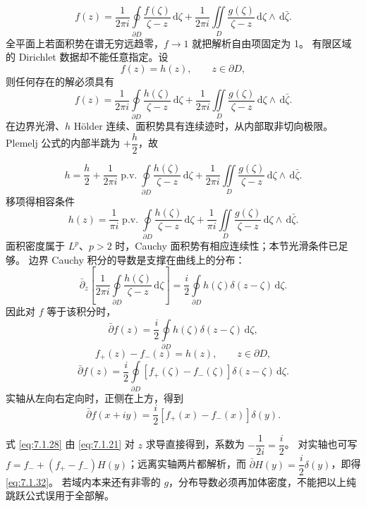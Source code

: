 \documentclass[lang=cn,scheme=chinese,mode=simple,device=normal,color=blue,math=cm,thmcnt=section,12pt]{elegantbook}
\newcommand{\dd}{\,\mathrm{d}}
\newcommand{\eqq}[2]{\tag{#1}\label{eq:#1}#2}
\begin{document}
\begin{equation}
\eqq{7.1.24}{f(z)=\dfrac{1}{2\pi i}\oint\limits_{\partial D}\dfrac{f(\zeta)}{\zeta-z}\dd\zeta
+\dfrac{1}{2\pi i}\iint\limits_D\dfrac{g(\zeta)}{\zeta-z}\dd\zeta\wedge\dd\bar\zeta.}
\end{equation}
全平面上若面积势在谱无穷远趋零，$f\to1$ 就把解析自由项固定为 1。
有限区域的 Dirichlet 数据却不能任意指定。设
\begin{equation}
\eqq{7.1.25}{f(z)=h(z),\qquad z\in\partial D,}
\end{equation}
则任何存在的解必须具有
\begin{equation}
\eqq{7.1.26}{f(z)=\dfrac{1}{2\pi i}\oint\limits_{\partial D}\dfrac{h(\zeta)}{\zeta-z}\dd\zeta
+\dfrac{1}{2\pi i}\iint\limits_D\dfrac{g(\zeta)}{\zeta-z}\dd\zeta\wedge\dd\bar\zeta.}
\end{equation}
在边界光滑、$h$ Hölder 连续、面积势具有连续迹时，从内部取非切向极限。Plemelj 公式的内部半跳为 $+\dfrac{h}{2}$，故

\[
h=\dfrac{h}{2}+\dfrac{1}{2\pi i}\operatorname{p.v.}\oint\limits_{\partial D}\dfrac{h(\zeta)}{\zeta-z}\dd\zeta
+\dfrac{1}{2\pi i}\iint\limits_D\dfrac{g(\zeta)}{\zeta-z}\dd\zeta\wedge\dd\bar\zeta.
\]
移项得相容条件
\begin{equation}
\eqq{7.1.27}{h(z)=\dfrac{1}{\pi i}\operatorname{p.v.}\oint\limits_{\partial D}\dfrac{h(\zeta)}{\zeta-z}\dd\zeta
+\dfrac{1}{\pi i}\iint\limits_D\dfrac{g(\zeta)}{\zeta-z}\dd\zeta\wedge\dd\bar\zeta.}
\end{equation}
面积密度属于 $L^p$、$p>2$ 时，Cauchy 面积势有相应连续性；本节光滑条件已足够。
边界 Cauchy 积分的导数是支撑在曲线上的分布：
\begin{equation}
\eqq{7.1.28}{\bar\partial_z\left[\dfrac{1}{2\pi i}\oint\limits_{\partial D}\dfrac{h(\zeta)}{\zeta-z}\dd\zeta\right]
=\dfrac{i}{2}\oint\limits_{\partial D}h(\zeta)\delta(z-\zeta)\dd\zeta.}
\end{equation}
因此对 $f$ 等于该积分时，
\begin{equation}
\eqq{7.1.29}{\bar\partial f(z)=\dfrac{i}{2}\oint\limits_{\partial D}h(\zeta)\delta(z-\zeta)\dd\zeta,}
\end{equation}
\begin{equation}
\eqq{7.1.30}{f_+(z)-f_-(z)=h(z),\qquad z\in\partial D,}
\end{equation}
\begin{equation}
\eqq{7.1.31}{\bar\partial f(z)=\dfrac{i}{2}\oint\limits_{\partial D}[f_+(\zeta)-f_-(\zeta)]\delta(z-\zeta)\dd\zeta.}
\end{equation}
实轴从左向右定向时，正侧在上方，得到
\begin{equation}
\eqq{7.1.32}{\bar\partial f(x+iy)=\dfrac{i}{2}[f_+(x)-f_-(x)]\delta(y).}
\end{equation}
\begin{callout}
式 \eqref{eq:7.1.28} 由 \eqref{eq:7.1.21} 对 $z$ 求导直接得到，系数为 $-\dfrac{1}{2i}=\dfrac{i}{2}$。
对实轴也可写 $f=f_-+(f_+-f_-)H(y)$；远离实轴两片都解析，而 $\bar\partial H(y)=\dfrac{i}{2}\delta(y)$，即得 \eqref{eq:7.1.32}。
若域内本来还有非零的 $g$，分布导数必须再加体密度，不能把以上纯跳跃公式误用于全部解。
\end{callout}
\end{document}
